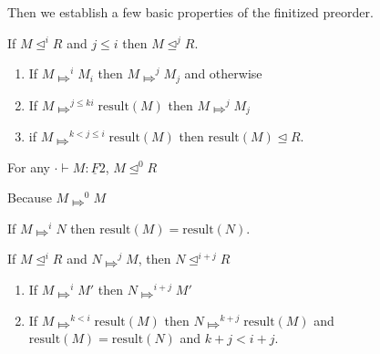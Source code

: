 \documentclass[acmsmall,nonacm]{acmart}
\renewcommand{\u}{\underline}
\newcommand{\apreorder}{\trianglelefteq}
\newcommand{\ix}[2]{\mathrel{#1^{#2}}}
\newcommand{\bigstepsin}[1]{\mathrel{\Mapsto^{#1}}}
\newcommand{\result}{\text{result}}
\begin{document}
{\begin{longonly}
Then we establish a few basic properties of the finitized preorder.
\begin{lemma}
  If $M \ix\apreorder i R$ and $j\leq i$ then $M \ix \apreorder j R$.
\end{lemma}
\begin{longproof} \hfill
  \begin{enumerate}
  \item If $M \bigstepsin{i} M_i$ then $M \bigstepsin{j} M_j$ and otherwise 
  \item If $M \bigstepsin{j \leq k i} \result(M)$ then $M \bigstepsin{j} M_j$
  \item if $M \bigstepsin{k < j \leq i} \result(M)$ then $\result(M) \apreorder R$.
  \end{enumerate}
\end{longproof}
\begin{lemma}[Triviality at $0$]
  For any $\cdot \vdash M : \u F 2$, $M \ix\apreorder 0 R$
\end{lemma}
\begin{longproof}
  Because $M \bigstepsin{0} M$
\end{longproof}
\begin{lemma}
  If $M \bigstepsin{i} N$ then $\result(M) = \result(N)$.
\end{lemma}
\begin{lemma}
  If $M \ix\apreorder i R$ and $N \bigstepsin{j} M$, then $N \ix\apreorder {{i+j}} R$
\end{lemma}
\begin{longproof}
  \begin{enumerate}
  \item If $M \bigstepsin{i} M'$ then $N \bigstepsin{i+j} M'$
  \item If $M \bigstepsin{k < i} \result(M)$ then $N \bigstepsin{k+j}
    \result(M)$ and $\result(M) = \result(N)$ and $k+j < i+j$.
  \end{enumerate}
\end{longproof}
\end{longonly}

}
\end{document}
